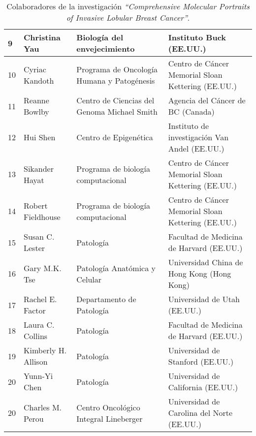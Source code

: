 \begin{table*}[!htb]
\begin{threeparttable}
\begin{tabular}{p{0.5cm} p{3.5cm} p{4cm} p{5.5cm}}
			9
			& Christina Yau
			& Biología del envejecimiento
			& Instituto Buck (EE.UU.)
			\\ \hline
			10
			& Cyriac Kandoth
			& Programa de Oncología Humana y Patogénesis
			& Centro de Cáncer Memorial Sloan Kettering (EE.UU.)
			\\ \hline
			11
			& Reanne Bowlby
			& Centro de Ciencias del Genoma Michael Smith
			& Agencia del Cáncer de BC (Canada)
			\\ \hline
			12
			& Hui Shen
			& Centro de Epigenética
			& Instituto de investigación Van Andel (EE.UU.)
			\\ \hline
			13
			& Sikander Hayat
			& Programa de biología computacional
			& Centro de Cáncer Memorial Sloan Kettering (EE.UU.)
			\\ \hline
			14
			& Robert Fieldhouse
			& Programa de biología computacional
			& Centro de Cáncer Memorial Sloan Kettering (EE.UU.)
			\\ \hline
			15
			& Susan C. Lester
			& Patología
			& Facultad de Medicina de Harvard (EE.UU.)
			\\ \hline
			16
			& Gary M.K. Tse
			& Patología Anatómica y Celular
			& Universidad China de Hong Kong (Hong Kong)
			\\ \hline
			17
			& Rachel E. Factor
			& Departamento de Patología
			& Universidad de Utah (EE.UU.)
			\\ \hline
			18
			& Laura C. Collins
			& Patología
			& Facultad de Medicina de Harvard (EE.UU.)
			\\ \hline
			19
			& Kimberly H. Allison
			& Patología
			& Universidad de Stanford (EE.UU.)
			\\ \hline
			20
			& Yunn-Yi Chen
			& Patología
			& Universidad de California (EE.UU.)
			\\ \hline
			20
			& Charles M. Perou
			& Centro Oncológico Integral Lineberger
			& Universidad de Carolina del Norte (EE.UU.)						
			\\ \hline	
		\end{tabular}
		\caption{Colaboradores de la investigación \textit{“Comprehensive Molecular Portraits of Invasive Lobular Breast Cancer”}.}
		\label{Molecular_Portraits}
	\end{threeparttable}
\end{table*}


